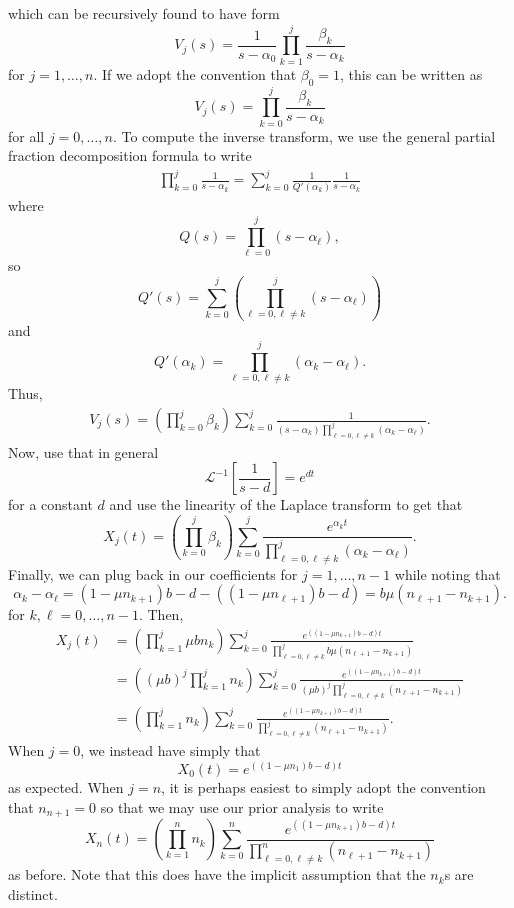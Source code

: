 \documentclass{article}
\begin{document}
which can be recursively found to have form
\[
V_j(s)=\frac{1}{s-\alpha_0}\prod_{k=1}^{j}\frac{\beta_k}{s-\alpha_k}
\]
for $j=1,\ldots,n$. If we adopt the convention that $\beta_0=1$, this can be written as
\[
V_j(s)=\prod_{k=0}^{j}\frac{\beta_k}{s-\alpha_k}
\] 
for all $j=0,\ldots,n$. To compute the inverse transform, we use the general partial fraction decomposition formula to write 
\begin{align*}
	\prod_{k=0}^{j}\frac{1}{s-\alpha_k}=\sum_{k=0}^{j}\frac{1}{Q'(\alpha_k)}\frac{1}{s-\alpha_k}
\end{align*}
where 
\[
Q(s)=\prod_{\ell=0}^{j}(s-\alpha_\ell),
\]
so
\[
Q'(s)=\sum_{k=0}^j\left(\prod_{\ell=0,\ell\neq k}^{j}(s-\alpha_\ell)\right)
\]
and
\[
Q'(\alpha_k)=\prod_{\ell=0,\ell\neq k}^{j}(\alpha_k-\alpha_\ell).
\]
Thus,
\begin{align*}
V_j(s)=\left(\prod_{k=0}^{j}\beta_k\right)\sum_{k=0}^{j}\frac{1}{(s-\alpha_k)\prod_{\ell=0,\ell\neq k}^{j}(\alpha_k-\alpha_\ell)}.
\end{align*}
Now, use that in general
\[
\mathcal{L}^{-1}\left[\frac{1}{s-d}\right]=e^{dt}
\]
for a constant $d$ and use the linearity of the Laplace transform to get that
\[
X_j(t)=\left(\prod_{k=0}^{j}\beta_k\right)\sum_{k=0}^{j}\frac{e^{\alpha_k t}}{\prod_{\ell=0,\ell\neq k}^{j}(\alpha_k-\alpha_\ell)}.
\]
Finally, we can plug back in our coefficients for $j=1,\ldots,n-1$ while noting that 
\[
\alpha_k-\alpha_\ell=(1-\mu n_{k+1})b-d-((1-\mu n_{\ell+1})b-d)=b\mu(n_{\ell+1}-n_{k+1}).
\] 
for $k,\ell=0,\ldots,n-1$. Then,
\begin{align*}
X_j(t)&=\left(\prod_{k=1}^{j}\mu bn_k\right)\sum_{k=0}^{j}\frac{e^{((1-\mu n_{k+1})b-d)t}}{\prod_{\ell=0,\ell\neq k}^{j}b\mu(n_{\ell+1}-n_{k+1})}\\&=
\left((\mu b)^j\prod_{k=1}^{j}n_k\right)\sum_{k=0}^{j}\frac{e^{((1-\mu n_{k+1})b-d)t}}{(\mu b)^j\prod_{\ell=0,\ell\neq k}^{j}(n_{\ell+1}-n_{k+1})}\\&=
\left(\prod_{k=1}^{j}n_k\right)\sum_{k=0}^{j}\frac{e^{((1-\mu n_{k+1})b-d) t}}{\prod_{\ell=0,\ell\neq k}^{j}(n_{\ell+1}-n_{k+1})}.
\end{align*}
When $j=0$, we instead have simply that
\[
X_0(t)=e^{((1-\mu n_{1})b-d)t}
\]
as expected. When $j=n$, it is perhaps easiest to simply adopt the convention that $n_{n+1}=0$ so that we may use our prior analysis to write
\[
X_n(t)=\left(\prod_{k=1}^{n}n_k\right)\sum_{k=0}^{n}\frac{e^{((1-\mu n_{k+1})b-d) t}}{\prod_{\ell=0,\ell\neq k}^{n}(n_{\ell+1}-n_{k+1})}
\]
as before. Note that this does have the implicit assumption that the $n_k$s are distinct.
\end{document}
